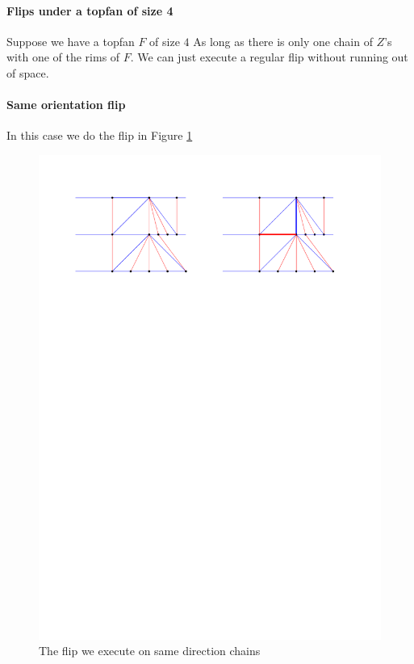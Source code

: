   \paragraph{Flips under a topfan of size 4}
  Suppose we have a topfan $F$ of size $4$
  As long as there is only one chain of $Z$'s with one of the rims of $F$. We can just execute a regular flip without running out of space.




  \paragraph{Same orientation flip}

  In this case we do the flip in Figure \ref{fig:uni:sameFlip}

  \begin{figure}[h]
    \centering
    \includegraphics[width =\textwidth]{unifiedAlgo/img/post/sameFlip}
    \caption{The flip we execute on same direction chains}
    \label{fig:uni:sameFlip}
  \end{figure}

